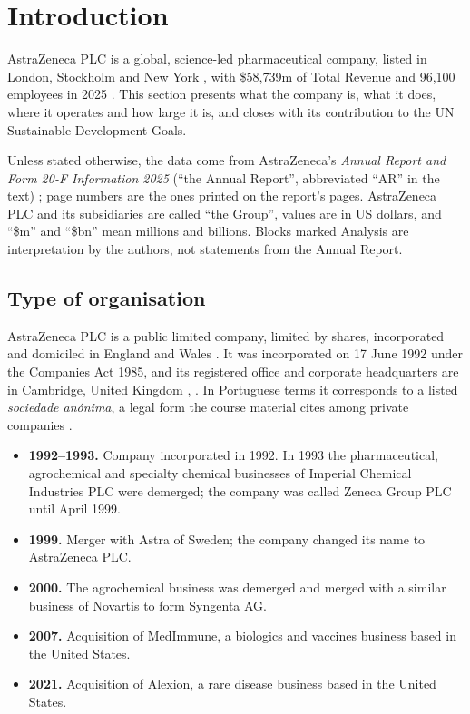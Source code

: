 \chapter{Introduction}

AstraZeneca PLC is a global, science-led pharmaceutical company, listed in London, Stockholm and New York \cite[p.~71]{AR}, with \$58,739m of Total Revenue \cite[p.~125]{AR} and 96,100 employees in 2025 \cite[p.~27]{AR}. This section presents what the company is, what it does, where it operates and how large it is, and closes with its contribution to the UN Sustainable Development Goals.

{\small\color{azmuted}
Unless stated otherwise, the data come from AstraZeneca's \textit{Annual Report and Form 20-F Information 2025} (``the Annual Report'', abbreviated ``AR'' in the text) \cite{AR}; page numbers are the ones printed on the report's pages. AstraZeneca PLC and its subsidiaries are called ``the Group'', values are in US dollars, and ``\$m'' and ``\$bn'' mean millions and billions. Blocks marked Analysis are interpretation by the authors, not statements from the Annual Report.
\par}

\section{Type of organisation}

AstraZeneca PLC is a public limited company, limited by shares, incorporated and domiciled in England and Wales \cite[p.~199]{AR}. It was incorporated on 17 June 1992 under the Companies Act 1985, and its registered office and corporate headquarters are in Cambridge, United Kingdom \cite[Item~4.A]{F20}, \cite[p.~230]{AR}. In Portuguese terms it corresponds to a listed \textit{sociedade anónima}, a legal form the course material cites among private companies \cite[p.~5]{INT}.

\begin{itemize}[leftmargin=*]
\item \textbf{1992--1993.} Company incorporated in 1992. In 1993 the pharmaceutical, agrochemical and specialty chemical businesses of Imperial Chemical Industries PLC were demerged; the company was called Zeneca Group PLC until April 1999. \cite[Item~4.A]{F20}
\item \textbf{1999.} Merger with Astra of Sweden; the company changed its name to AstraZeneca PLC. \cite[Item~4.A]{F20}
\item \textbf{2000.} The agrochemical business was demerged and merged with a similar business of Novartis to form Syngenta AG. \cite[Item~4.A]{F20}
\item \textbf{2007.} Acquisition of MedImmune, a biologics and vaccines business based in the United States. \cite[Item~4.A]{F20}
\item \textbf{2021.} Acquisition of Alexion, a rare disease business based in the United States. \cite[Item~4.A]{F20}
\end{itemize}

